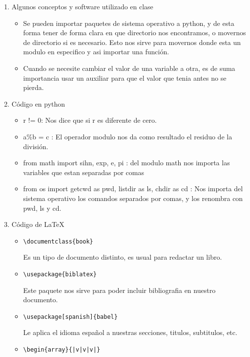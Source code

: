 \documentclass{book}
\begin{document}
\begin{enumerate}%
	\item Algunos conceptos y software utilizado en clase%
	\begin{itemize}
		\item Se pueden importar paquetes de sistema operativo a python, y de esta forma tener de forma clara en que directorio nos encontramos, o movernos de directorio si es necesario. Esto nos sirve para movernos donde esta un modulo en especifico y asi importar una función.
		\item Cuando se necesite cambiar el valor de una variable a otra, es de suma importancia usar un auxiliar para que el valor que tenia antes no se pierda.	
		
	\end{itemize}
	
	\item Código en python%
	\begin{itemize}%
		\item r != 0: Nos dice que si r es diferente de cero.
		\item a\%b = c : El operador modulo nos da como resultado el residuo de la división.
		\item from math import sihn, exp, e, pi : del modulo math nos importa las variables que estan separadas por comas
		\item from os import getcwd as pwd, listdir as ls, chdir as cd : Nos importa del sistema operativo los comandos separados por comas, y los renombra con pwd, ls y cd.
		
		
		
		
	\end{itemize}%
	\item Código de \LaTeX
	\begin{itemize}
		\item 
		\begin{lstlisting}
\documentclass{book}
		\end{lstlisting} Es un tipo de documento distinto, es usual para redactar un libro.
		\item  
		\begin{lstlisting}  
\usepackage{biblatex}
		\end{lstlisting} Este paquete nos sirve para poder incluir bibliografia en nuestro documento. 
		\item 
		\begin{lstlisting}  
\usepackage[spanish]{babel}
		\end{lstlisting} Le aplica el idioma español a nuestras secciones, titulos, subtitulos, etc. 
		\item 
		\begin{lstlisting}  
\begin{array}{|v|v|v|}
	

\end{lstlisting}
\end{itemize}
\end{enumerate}
\end{document}

